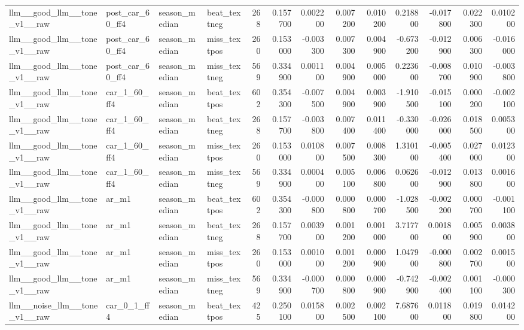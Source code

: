 \begin{table}
\begin{tabular}{llllrrrrrrrrr}
llm\_\_good\_llm\_\_tone\_v1\_\_raw & post\_car\_60\_ff4 & season\_median & beat\_textneg & 268 & 0.157700 & 0.002200 & 0.007200 & 0.010200 & 0.218800 & -0.017800 & 0.022300 & 0.010200 \\
llm\_\_good\_llm\_\_tone\_v1\_\_raw & post\_car\_60\_ff4 & season\_median & miss\_textpos & 260 & 0.153000 & -0.003300 & 0.007300 & 0.004900 & -0.673200 & -0.012900 & 0.006300 & -0.016000 \\
llm\_\_good\_llm\_\_tone\_v1\_\_raw & post\_car\_60\_ff4 & season\_median & miss\_textneg & 569 & 0.334900 & 0.001100 & 0.004900 & 0.005000 & 0.223600 & -0.008700 & 0.010900 & -0.003800 \\
llm\_\_good\_llm\_\_tone\_v1\_\_raw & car\_1\_60\_ff4 & season\_median & beat\_textpos & 602 & 0.354300 & -0.007500 & 0.004900 & 0.003900 & -1.910500 & -0.015100 & 0.000200 & -0.002100 \\
llm\_\_good\_llm\_\_tone\_v1\_\_raw & car\_1\_60\_ff4 & season\_median & beat\_textneg & 268 & 0.157700 & -0.003800 & 0.007400 & 0.011400 & -0.330000 & -0.026000 & 0.018500 & 0.005300 \\
llm\_\_good\_llm\_\_tone\_v1\_\_raw & car\_1\_60\_ff4 & season\_median & miss\_textpos & 260 & 0.153000 & 0.010800 & 0.007500 & 0.008300 & 1.310100 & -0.005400 & 0.027000 & 0.012300 \\
llm\_\_good\_llm\_\_tone\_v1\_\_raw & car\_1\_60\_ff4 & season\_median & miss\_textneg & 569 & 0.334900 & 0.000400 & 0.005100 & 0.006800 & 0.062600 & -0.012900 & 0.013800 & 0.001600 \\
llm\_\_good\_llm\_\_tone\_v1\_\_raw & ar\_m1 & season\_median & beat\_textpos & 602 & 0.354300 & -0.000800 & 0.000800 & 0.000700 & -1.028500 & -0.002200 & 0.000700 & -0.001100 \\
llm\_\_good\_llm\_\_tone\_v1\_\_raw & ar\_m1 & season\_median & beat\_textneg & 268 & 0.157700 & 0.003900 & 0.001200 & 0.001000 & 3.717700 & 0.001800 & 0.005900 & 0.003800 \\
llm\_\_good\_llm\_\_tone\_v1\_\_raw & ar\_m1 & season\_median & miss\_textpos & 260 & 0.153000 & 0.001000 & 0.001200 & 0.000900 & 1.047900 & -0.000800 & 0.002700 & 0.001500 \\
llm\_\_good\_llm\_\_tone\_v1\_\_raw & ar\_m1 & season\_median & miss\_textneg & 569 & 0.334900 & -0.000700 & 0.000800 & 0.000900 & -0.742900 & -0.002400 & 0.001100 & -0.000300 \\
llm\_\_noise\_llm\_\_tone\_v1\_\_raw & car\_0\_1\_ff4 & season\_median & beat\_textpos & 425 & 0.250100 & 0.015800 & 0.002500 & 0.002100 & 7.687600 & 0.011800 & 0.019800 & 0.014200 \\

\end{tabular}
\end{table}
